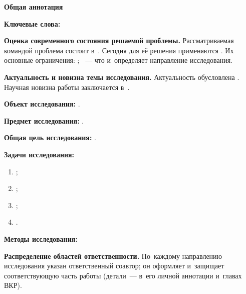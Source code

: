 \documentclass[12pt,a4paper]{extarticle}
\begin{document}
\sloppy



\begin{center}
  \textbf{\large Общая аннотация}
\end{center}

\vspace{0.4em}

\noindent\textbf{Ключевые слова:} 

\medskip
\noindent\textbf{Оценка современного состояния решаемой проблемы.} Рассматриваемая командой проблема состоит в~. Сегодня для её решения применяются  \cite{example-en}. Их основные ограничения: ; ~--- что и~определяет направление исследования.

\medskip
\noindent\textbf{Актуальность и новизна темы исследования.} Актуальность обусловлена . Научная новизна работы заключается в~.

\medskip
\noindent\textbf{Объект исследования:} .

\smallskip
\noindent\textbf{Предмет исследования:} .

\smallskip
\noindent\textbf{Общая цель исследования:} .

\medskip
\noindent\textbf{Задачи исследования:}
\begin{enumerate}[label=\arabic*), leftmargin=1.3cm, topsep=2pt, itemsep=2pt]
  \item {};
  \item {};
  \item {};
  \item {}.
\end{enumerate}

\medskip
\noindent\textbf{Методы исследования:} 

\medskip
\noindent\textbf{Распределение областей ответственности.} По~каждому направлению исследования указан ответственный соавтор; он оформляет и~защищает соответствующую часть работы (детали~--- в~его личной аннотации и~главах ВКР).
\end{document}
